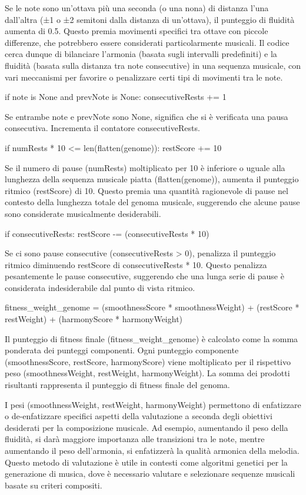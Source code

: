 \documentclass[a4paper,12pt]{report}
\begin{document}
Se le note sono un'ottava più una seconda (o una nona) di distanza l'una dall'altra (±1 o ±2 semitoni dalla distanza di un'ottava), il punteggio di fluidità aumenta di 0.5. 
Questo premia movimenti specifici tra ottave con piccole differenze, che potrebbero essere considerati particolarmente musicali.
Il codice cerca dunque di bilanciare l'armonia (basata sugli intervalli predefiniti) e la fluidità (basata sulla distanza tra note consecutive) in una sequenza musicale, con vari meccanismi per favorire o penalizzare certi tipi di movimenti tra le note.

if note is None and prevNote is None:
    consecutiveRests += 1

Se entrambe note e prevNote sono None, significa che si è verificata una pausa consecutiva. Incrementa il contatore consecutiveRests.

if numRests * 10 <= len(flatten(genome)):
    restScore += 10

Se il numero di pause (numRests) moltiplicato per 10 è inferiore o uguale alla lunghezza della sequenza musicale piatta (flatten(genome)), aumenta il punteggio ritmico (restScore) di 10. 
Questo premia una quantità ragionevole di pause nel contesto della lunghezza totale del genoma musicale, suggerendo che alcune pause sono considerate musicalmente desiderabili.

if consecutiveRests:
    restScore -= (consecutiveRests * 10)

Se ci sono pause consecutive (consecutiveRests > 0), penalizza il punteggio ritmico diminuendo restScore di consecutiveRests * 10. 
Questo penalizza pesantemente le pause consecutive, suggerendo che una lunga serie di pause è considerata indesiderabile dal punto di vista ritmico.

fitness_weight_genome = (smoothnessScore * smoothnessWeight) + (restScore * restWeight) + (harmonyScore * harmonyWeight)

Il punteggio di fitness finale (fitness_weight_genome) è calcolato come la somma ponderata dei punteggi componenti.
Ogni punteggio componente (smoothnessScore, restScore, harmonyScore) viene moltiplicato per il rispettivo peso (smoothnessWeight, restWeight, harmonyWeight).
La somma dei prodotti risultanti rappresenta il punteggio di fitness finale del genoma.

I pesi (smoothnessWeight, restWeight, harmonyWeight) permettono di enfatizzare o de-enfatizzare specifici aspetti della valutazione a seconda degli obiettivi desiderati per la composizione musicale. 
Ad esempio, aumentando il peso della fluidità, si darà maggiore importanza alle transizioni tra le note, mentre aumentando il peso dell'armonia, si enfatizzerà la qualità armonica della melodia. 
Questo metodo di valutazione è utile in contesti come algoritmi genetici per la generazione di musica, dove è necessario valutare e selezionare sequenze musicali basate su criteri compositi.
\end{document}
